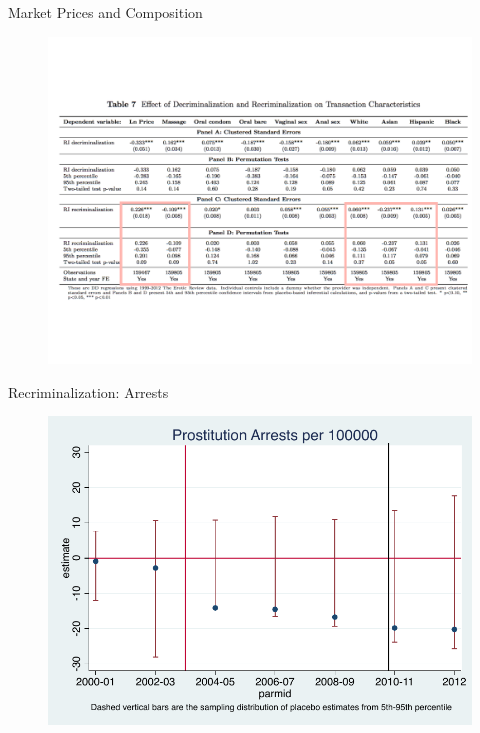 \documentclass{beamer}
\begin{document}
\begin{frame}{Market Prices and Composition}
	\begin{figure}
	\includegraphics[scale=0.4]{./lecture_includes/table7.pdf}
	\end{figure}
\end{frame}

\begin{frame}[shrink=20]{Recriminalization: Arrests}
	\begin{figure}
	\includegraphics[scale=1]{./lecture_includes/eclplot_2012_pro_2.pdf}
	\end{figure}
\end{frame}
\end{document}
